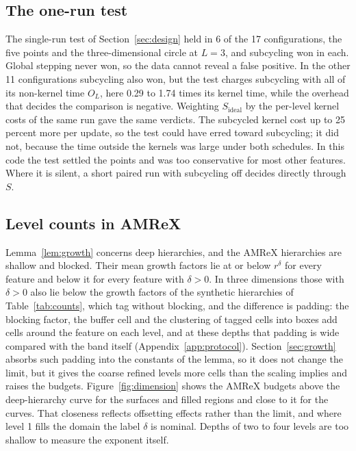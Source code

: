 \documentclass[12pt]{article}
\theoremstyle{remark}
\newcommand{\Sid}{S_{\mathrm{ideal}}}
\begin{document}
\subsection{The one-run test}\label{sec:onerun}

The single-run test of Section~\ref{sec:design} held in 6 of the 17 configurations, the five points and the three-dimensional circle at $L=3$, and subcycling won in each. Global stepping never won, so the data cannot reveal a false positive. In the other 11 configurations subcycling also won, but the test charges subcycling with all of its non-kernel time $O_L$, here 0.29 to 1.74 times its kernel time, while the overhead that decides the comparison is negative. Weighting $\Sid$ by the per-level kernel costs of the same run gave the same verdicts. The subcycled kernel cost up to 25 percent more per update, so the test could have erred toward subcycling; it did not, because the time outside the kernels was large under both schedules. In this code the test settled the points and was too conservative for most other features. Where it is silent, a short paired run with subcycling off decides directly through $S$.

\subsection{Level counts in AMReX}\label{sec:counts-amrex}

Lemma~\ref{lem:growth} concerns deep hierarchies, and the AMReX hierarchies are shallow and blocked. Their mean growth factors lie at or below $r^\delta$ for every feature and below it for every feature with $\delta>0$. In three dimensions those with $\delta>0$ also lie below the growth factors of the synthetic hierarchies of Table~\ref{tab:counts}, which tag without blocking, and the difference is padding: the blocking factor, the buffer cell and the clustering of tagged cells into boxes add cells around the feature on each level, and at these depths that padding is wide compared with the band itself (Appendix~\ref{app:protocol}). Section~\ref{sec:growth} absorbs such padding into the constants of the lemma, so it does not change the limit, but it gives the coarse refined levels more cells than the scaling implies and raises the budgets. Figure~\ref{fig:dimension} shows the AMReX budgets above the deep-hierarchy curve for the surfaces and filled regions and close to it for the curves. That closeness reflects offsetting effects rather than the limit, and where level 1 fills the domain the label $\delta$ is nominal. Depths of two to four levels are too shallow to measure the exponent itself.
\end{document}
